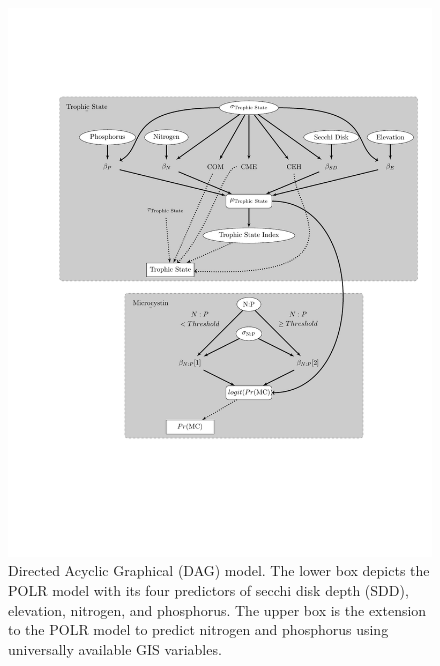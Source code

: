 \documentclass[fleqn,10pt,lineno]{wlpeerj} %
\begin{document}
\begin{figure}
  \includegraphics[page=4, scale=0.85, trim=20mm 45mm 0mm 45mm, clip]{cyanobacteria-dag-model1.pdf}
  \caption{Directed Acyclic Graphical (DAG) model. The lower box depicts the POLR model with its four predictors of secchi disk depth (SDD), elevation, nitrogen, and phosphorus. The upper box is the extension to the POLR model to predict nitrogen and phosphorus using universally available GIS variables.}
  \label{fig:DAG2}
\end{figure}
\end{document}
